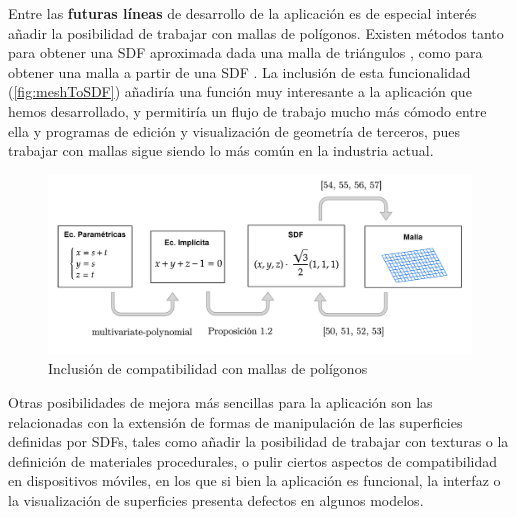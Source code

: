 Entre las \textbf{futuras líneas} de desarrollo de la aplicación es de especial interés añadir la posibilidad de trabajar con mallas de polígonos. Existen métodos tanto para obtener una SDF aproximada dada una malla de triángulos \cite{meshToSDF2, meshToSDF3, meshToSDF4, meshToSDF5}, como para obtener una malla a partir de una SDF \cite{sdfToMesh, sdfToMesh2, sdfToMesh3, sdfToMesh4}. La inclusión de esta funcionalidad (\autoref{fig:meshToSDF}) añadiría una función muy interesante a la aplicación que hemos desarrollado, y permitiría un flujo de trabajo mucho más cómodo entre ella y programas de edición y visualización de geometría de terceros, pues trabajar con mallas sigue siendo lo más común en la industria actual. 
\begin{figure}[!ht]
    \centering
    \includegraphics[width=\textwidth]{Plantilla-TFG-master/img/meshToSDF.png}
    \caption{Inclusión de compatibilidad con mallas de polígonos}
    \label{fig:meshToSDF}
\end{figure}
Otras posibilidades de mejora más sencillas para la aplicación son las relacionadas con la extensión de formas de manipulación de las superficies definidas por SDFs, tales como añadir la posibilidad de trabajar con texturas o la definición de materiales procedurales, o pulir ciertos aspectos de compatibilidad en dispositivos móviles, en los que si bien la aplicación es funcional, la interfaz o la visualización de superficies presenta defectos en algunos modelos.\newline

